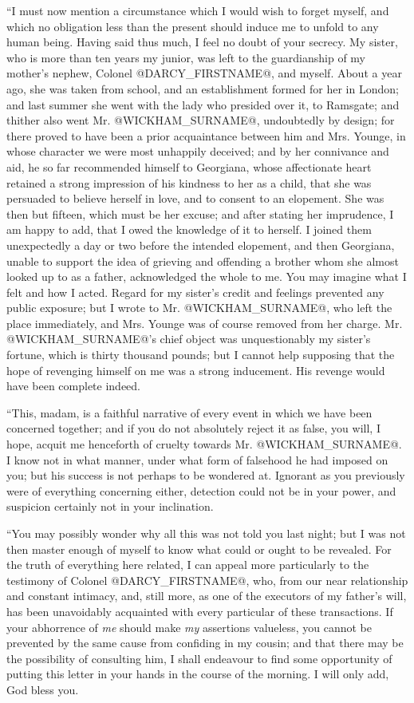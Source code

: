 ``I must now mention a circumstance which I would wish to forget myself,
and which no obligation less than the present should induce me to unfold
to any human being. Having said thus much, I feel no doubt of your
secrecy. My sister, who is more than ten years my junior, was left to
the guardianship of my mother's nephew, Colonel @DARCY_FIRSTNAME@, and myself.
About a year ago, she was taken from school, and an establishment formed
for her in London; and last summer she went with the lady who presided
over it, to Ramsgate; and thither also went Mr. @WICKHAM_SURNAME@, undoubtedly by
design; for there proved to have been a prior acquaintance between him
and Mrs. Younge, in whose character we were most unhappily deceived; and
by her connivance and aid, he so far recommended himself to Georgiana,
whose affectionate heart retained a strong impression of his kindness to
her as a child, that she was persuaded to believe herself in love, and
to consent to an elopement. She was then but fifteen, which must be her
excuse; and after stating her imprudence, I am happy to add, that I owed
the knowledge of it to herself. I joined them unexpectedly a day or two
before the intended elopement, and then Georgiana, unable to support the
idea of grieving and offending a brother whom she almost looked up to as
a father, acknowledged the whole to me. You may imagine what I felt and
how I acted. Regard for my sister's credit and feelings prevented
any public exposure; but I wrote to Mr. @WICKHAM_SURNAME@, who left the place
immediately, and Mrs. Younge was of course removed from her charge. Mr.
@WICKHAM_SURNAME@'s chief object was unquestionably my sister's fortune, which
is thirty thousand pounds; but I cannot help supposing that the hope of
revenging himself on me was a strong inducement. His revenge would have
been complete indeed.

``This, madam, is a faithful narrative of every event in which we have
been concerned together; and if you do not absolutely reject it as
false, you will, I hope, acquit me henceforth of cruelty towards Mr.
@WICKHAM_SURNAME@. I know not in what manner, under what form of falsehood he
had imposed on you; but his success is not perhaps to be wondered
at. Ignorant as you previously were of everything concerning either,
detection could not be in your power, and suspicion certainly not in
your inclination.

``You may possibly wonder why all this was not told you last night; but
I was not then master enough of myself to know what could or ought to
be revealed. For the truth of everything here related, I can appeal more
particularly to the testimony of Colonel @DARCY_FIRSTNAME@, who, from our
near relationship and constant intimacy, and, still more, as one of
the executors of my father's will, has been unavoidably acquainted
with every particular of these transactions. If your abhorrence of \textit{me}
should make \textit{my} assertions valueless, you cannot be prevented by
the same cause from confiding in my cousin; and that there may be
the possibility of consulting him, I shall endeavour to find some
opportunity of putting this letter in your hands in the course of the
morning. I will only add, God bless you.

